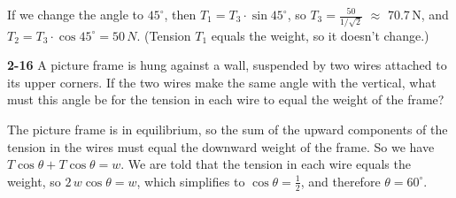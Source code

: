 \documentclass{amsart}
\begin{document}
If we change the angle to $45^\circ$, then $T_1 = T_3 \cdot \sin 45^\circ$, 
so $T_3 = \frac{50}{1/\sqrt{2}}$ $\approx$ 70.7\,N, 
and $T_2 = T_3 \cdot \cos 45^\circ = 50\,N$.  
(Tension $T_1$ equals the weight, so it doesn't change.)

\vspace{\baselineskip}
\noindent
\textbf{2-16} A picture frame is hung against a wall, suspended by two wires
attached to its upper corners.
If the two wires make the same angle with the vertical, 
what must this angle be for the tension in each wire to equal the weight of the frame?

The picture frame is in equilibrium, so the sum of the upward components of the tension in the wires
must equal the downward weight of the frame.  So we have $T \cos \theta + T \cos \theta = w$.
We are told that the tension in each wire equals the weight, so $2\,w \cos \theta = w$, 
which simplifies to $\cos \theta = \frac{1}{2}$, and therefore $\theta = 60^\circ$.
\end{document}

